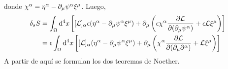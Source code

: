 donde $\chi^\alpha =\eta^\alpha -\partial_\mu \psi^\alpha \xi^\mu $. Luego,
\begin{align}
  \delta_sS&=\int_\Omega\dd^4x\left[[\mathcal{L} ]_\alpha \epsilon(\eta^\alpha -\partial_\mu \psi^\alpha \xi^\mu )+\partial_\mu \left(\epsilon\chi^{\alpha}\pdv{\mathcal{L}}{(\partial_\mu\psi^\alpha)}+\epsilon\mathcal{L} \xi^\mu \right)\right]\\
  &=\epsilon\int_\Omega\dd^4x\left[[\mathcal{L} ]_\alpha (\eta^\alpha -\partial_\mu \psi^\alpha \xi^\mu )+\partial_\mu \left(\chi^\alpha \pdv{\mathcal{L}}{(\partial_\mu\partial^\alpha)}+\mathcal{L} \xi^\mu  \right)\right]
\end{align}
A partir de aquí se formulan los dos teoremas de Noether.

















































